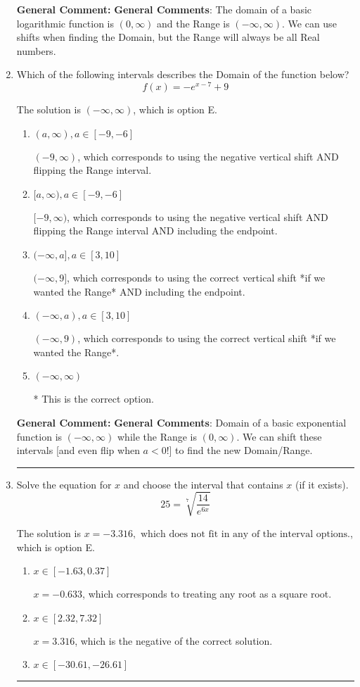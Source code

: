 \documentclass{extbook}[14pt]
\newcommand{\litem}[1]{\item #1

\rule{\textwidth}{0.4pt}}
\begin{document}
\begin{enumerate}
{\textbf{General Comment:} \textbf{General Comments}: The domain of a basic logarithmic function is $(0, \infty)$ and the Range is $(-\infty, \infty)$. We can use shifts when finding the Domain, but the Range will always be all Real numbers.
}
\litem{
Which of the following intervals describes the Domain of the function below?
\[ f(x) = -e^{x-7}+9 \]

The solution is \( (-\infty, \infty) \), which is option E.\begin{enumerate}[label=\Alph*.]
\item \( (a, \infty), a \in [-9, -6] \)

$(-9, \infty)$, which corresponds to using the negative vertical shift AND flipping the Range interval.
\item \( [a, \infty), a \in [-9, -6] \)

$[-9, \infty)$, which corresponds to using the negative vertical shift AND flipping the Range interval AND including the endpoint.
\item \( (-\infty, a], a \in [3, 10] \)

$(-\infty, 9]$, which corresponds to using the correct vertical shift *if we wanted the Range* AND including the endpoint.
\item \( (-\infty, a), a \in [3, 10] \)

$(-\infty, 9)$, which corresponds to using the correct vertical shift *if we wanted the Range*.
\item \( (-\infty, \infty) \)

* This is the correct option.
\end{enumerate}

\textbf{General Comment:} \textbf{General Comments}: Domain of a basic exponential function is $(-\infty, \infty)$ while the Range is $(0, \infty)$. We can shift these intervals [and even flip when $a<0$!] to find the new Domain/Range.
}
\litem{
 Solve the equation for $x$ and choose the interval that contains $x$ (if it exists).
\[  25 = \sqrt[7]{\frac{14}{e^{6x}}} \]

The solution is \( x = -3.316, \text{ which does not fit in any of the interval options.} \), which is option E.\begin{enumerate}[label=\Alph*.]
\item \( x \in [-1.63, 0.37] \)

$x = -0.633$, which corresponds to treating any root as a square root.
\item \( x \in [2.32, 7.32] \)

$x = 3.316$, which is the negative of the correct solution.
\item \( x \in [-30.61, -26.61] \)


\end{enumerate}}
\end{enumerate}
\end{document}
